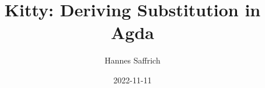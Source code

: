 \documentclass[aspectratio=169]{beamer}
\title{Kitty: Deriving Substitution in Agda}
\author[Saffrich]{Hannes Saffrich}
\institute[]{University of Freiburg}
\date{2022-11-11}
\begin{document}
  \begin{frame}
    \titlepage
  \end{frame}




  \clearpage
\end{document}
